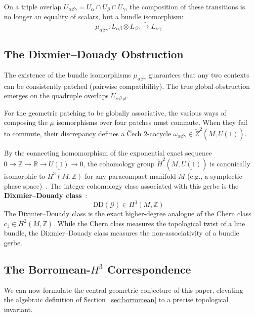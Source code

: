 \documentclass[11pt]{article}
\begin{document}
On a triple overlap $U_{\alpha\beta\gamma} = U_\alpha \cap U_\beta \cap U_\gamma$, the composition of these transitions is no longer an equality of scalars, but a bundle isomorphism:
\[
    \mu_{\alpha\beta\gamma} : L_{\alpha\beta} \otimes L_{\beta\gamma} \xrightarrow{\sim} L_{\alpha\gamma}
\]

\subsection{The Dixmier--Douady Obstruction}

The existence of the bundle isomorphisms $\mu_{\alpha\beta\gamma}$ guarantees that any two contexts can be consistently patched (pairwise compatibility). The true global obstruction emerges on the quadruple overlaps $U_{\alpha\beta\gamma\delta}$.

For the geometric patching to be globally associative, the various ways of composing the $\mu$ isomorphisms over four patches must commute. When they fail to commute, their discrepancy defines a \v{C}ech 2-cocycle $\omega_{\alpha\beta\gamma} \in \check{Z}^2(M, \underline{U(1)})$.

By the connecting homomorphism of the exponential exact sequence $0 \to \mathbb{Z} \to \mathbb{R} \to \underline{U(1)} \to 0$, the cohomology group $\check{H}^2(M, \underline{U(1)})$ is canonically isomorphic to $H^3(M, \mathbb{Z})$ for any paracompact manifold $M$ (e.g., a symplectic phase space)~\cite{Brylinski93}. The integer cohomology class associated with this gerbe is the \textbf{Dixmier--Douady class}~\cite{DD63}:
\[
    \mathrm{DD}(\mathcal{G}) \in H^3(M, \mathbb{Z})
\]
The Dixmier--Douady class is the exact higher-degree analogue of the Chern class $c_1 \in H^2(M, \mathbb{Z})$. While the Chern class measures the topological twist of a line bundle, the Dixmier--Douady class measures the non-associativity of a bundle gerbe.

\subsection{The Borromean-$H^3$ Correspondence}

We can now formulate the central geometric conjecture of this paper, elevating the algebraic definition of Section~\ref{sec:borromean} to a precise topological invariant.
\end{document}
